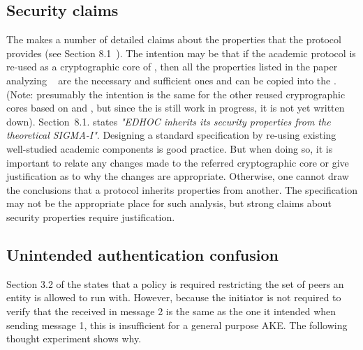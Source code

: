 \documentclass[runningheads,draft,x11names]{llncs}
\begin{document}
%

\subsection{Security claims}
\label{sec:securityClaims}
The \mSpec{} makes a number of detailed claims about the properties that 
the protocol provides (see Section 8.1~\cite{selander-lake-edhoc-01}).
%
The intention may be that if the academic protocol \mSigma{} is re-used as a
cryptographic core of \mEdhoc, then all the properties listed
in the paper analyzing \mSigma~\cite{DBLP:conf/crypto/CanettiK02} are the
necessary and sufficient ones and can be copied into the \mSpec.
%
(Note: presumably the intention is the same for the other reused cryprographic
cores based on \mOptls{} and \mNoise{}, but since the \mSpec{} is still work in
progress, it is not yet written down).
%
Section~8.1. states \emph{"EDHOC inherits its security properties
from the theoretical SIGMA-I"}.
%
Designing a standard specification by re-using existing well-studied academic
components is good practice.
%
But when doing so, it is important to relate any changes made to the referred
cryptographic core or give justification as to why the changes are appropriate.
%
Otherwise, one cannot draw the conclusions that a protocol inherits properties
from another.
%
The specification may not be the appropriate place for such analysis, but strong
claims about security properties require justification.
%

\subsection{Unintended authentication confusion}
\label{sec:usableSecurity}
Section 3.2 of the \mSpec states that a policy is required restricting the set
of peers an entity is allowed to run \mEdhoc{} with. 
%
However, because the initiator is not required to verify that the \mIdcredr{}
received in message 2 is the same as the one it intended when sending message 1,
this is insufficient for a general purpose AKE.
%
The following thought experiment shows why.
\end{document}
